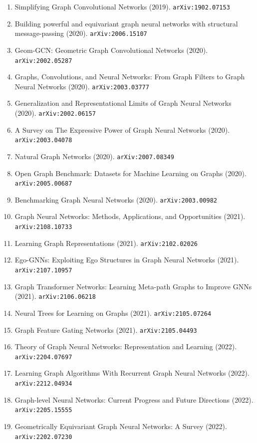 \documentclass[11pt]{article}
\begin{document}
\begin{enumerate}
  \item Simplifying Graph Convolutional Networks (2019). \texttt{arXiv:1902.07153}
  \item Building powerful and equivariant graph neural networks with structural
  message-passing (2020). \texttt{arXiv:2006.15107}
  \item Geom-GCN: Geometric Graph Convolutional Networks (2020). \texttt{arXiv:2002.05287}
  \item Graphs, Convolutions, and Neural Networks: From Graph Filters to Graph
  Neural Networks (2020). \texttt{arXiv:2003.03777}
  \item Generalization and Representational Limits of Graph Neural Networks (2020). \texttt{arXiv:2002.06157}
  \item A Survey on The Expressive Power of Graph Neural Networks (2020). \texttt{arXiv:2003.04078}
  \item Natural Graph Networks (2020). \texttt{arXiv:2007.08349}
  \item Open Graph Benchmark: Datasets for Machine Learning on Graphs (2020). \texttt{arXiv:2005.00687}
  \item Benchmarking Graph Neural Networks (2020). \texttt{arXiv:2003.00982}
  \item Graph Neural Networks: Methods, Applications, and Opportunities (2021). \texttt{arXiv:2108.10733}
  \item Learning Graph Representations (2021). \texttt{arXiv:2102.02026}
  \item Ego-GNNs: Exploiting Ego Structures in Graph Neural Networks (2021). \texttt{arXiv:2107.10957}
  \item Graph Transformer Networks: Learning Meta-path Graphs to Improve GNNs (2021). \texttt{arXiv:2106.06218}
  \item Neural Trees for Learning on Graphs (2021). \texttt{arXiv:2105.07264}
  \item Graph Feature Gating Networks (2021). \texttt{arXiv:2105.04493}
  \item Theory of Graph Neural Networks: Representation and Learning (2022). \texttt{arXiv:2204.07697}
  \item Learning Graph Algorithms With Recurrent Graph Neural Networks (2022). \texttt{arXiv:2212.04934}
  \item Graph-level Neural Networks: Current Progress and Future Directions (2022). \texttt{arXiv:2205.15555}
  \item Geometrically Equivariant Graph Neural Networks: A Survey (2022). \texttt{arXiv:2202.07230}

\end{enumerate}
\end{document}
